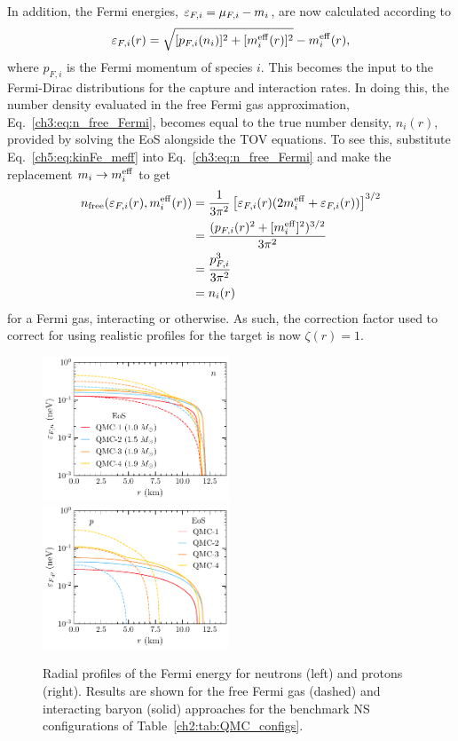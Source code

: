 In addition, the Fermi energies, $\varepsilon_{F,i} = \mu_{F,i} - m_i$, are now calculated according to 
\begin{equation}
   \varepsilon_{F,i}(r) = \sqrt{[p_{F,i}(n_i)]^2 + [m_i^{\rm eff}(r)]^2} - m_i^{\rm eff}(r),
   \label{ch5:eq:kinFe_meff}
\end{equation}
where $p_{F,i}$ is the Fermi momentum of species $i$. This becomes the input to the Fermi-Dirac distributions for the capture and interaction rates. In doing this, the number density evaluated in the free Fermi gas approximation, Eq.~\ref{ch3:eq:n_free_Fermi}, becomes equal to the true number density, $n_i(r)$, provided by solving the EoS alongside the TOV equations. To see this, substitute Eq.~\ref{ch5:eq:kinFe_meff} into Eq.~\ref{ch3:eq:n_free_Fermi} and make the replacement $m_i\rightarrow m_i^{\rm eff}$ to get
\begin{align}
   n_\mathrm{free}(\varepsilon_{F,i}(r), m_i^{\rm eff}(r)) & = \frac{1}{3\pi^2}\left[ \varepsilon_{F,i}(r)(2m_i^{\rm eff} + \varepsilon_{F,i}(r))\right]^{3/2}\\
   & = \frac{(p_{F,i}(r)^2 + [m_i^{\rm eff}]^2)^{3/2}}{3\pi^2}\\
   & = \frac{p_{F, i}^3}{3\pi^2}\\
   & = n_i(r)
\end{align}
for a Fermi gas, interacting or otherwise. 
As such, the correction factor used to correct for using realistic profiles for the target is now $\zeta(r) = 1$.


\begin{figure}[t!bp]
   \centering
\includegraphics[width=0.495\textwidth]{capture_3/muFn_meff_r_QMC.pdf}
\includegraphics[width=0.495\textwidth]{capture_3/muFp_meff_r_QMC.pdf}
   \caption{Radial profiles of the Fermi energy for neutrons (left) and protons (right). Results are shown for the free Fermi gas (dashed) and interacting baryon (solid) approaches for the benchmark NS configurations of Table~\ref{ch2:tab:QMC_configs}.
   }
   \label{ch5:fig:muradprofs}
\end{figure}

